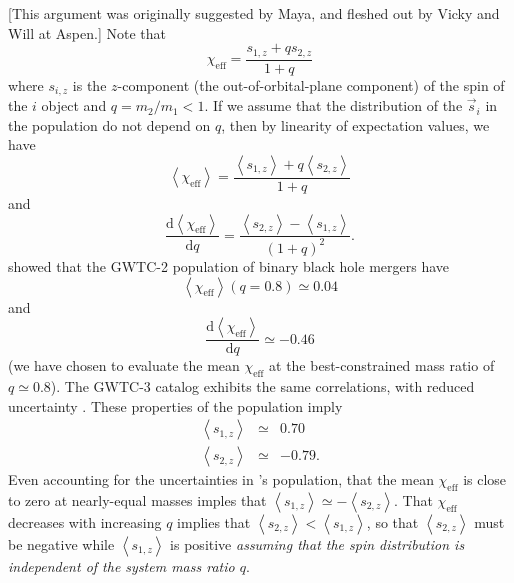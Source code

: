 \documentclass[modern]{aastex631}
\newcommand{\dd}{\mathrm{d}}
\newcommand{\diff}[2]{\frac{\dd #1}{\dd #2}}
\newcommand{\mean}[1]{\left\langle #1 \right\rangle}
\newcommand{\chieff}{\chi_{\mathrm{eff}}}
\begin{document}
[This argument was originally suggested by Maya, and fleshed out by Vicky and
Will at Aspen.]  Note that 
\begin{equation}
    \chieff = \frac{s_{1,z} + q s_{2,z}}{1+q}
\end{equation}
where $s_{i,z}$ is the $z$-component (the out-of-orbital-plane component) of the
spin of the $i$ object and $q = m_2 / m_1 < 1$.  If we assume that the
distribution of the $\vec{s}_i$ in the population do not depend on $q$, then by
linearity of expectation values, we have 
\begin{equation}
    \mean{\chieff} = \frac{\mean{s_{1,z}} + q \mean{s_{2,z}}}{1+q}
\end{equation}
and 
\begin{equation}
    \diff{\mean{\chieff}}{q} = \frac{\mean{s_{2,z}} - \mean{s_{1,z}}}{\left( 1 + q \right)^2}.
\end{equation}
\citet{Callister2021} showed that the GWTC-2 \citep{Abbott2021GWTC-2} population
of binary black hole mergers have 
\begin{equation}
    \mean{\chieff}\left( q = 0.8 \right) \simeq 0.04
\end{equation}
and
\begin{equation}
    \diff{\mean{\chieff}}{q} \simeq -0.46
\end{equation}
(we have chosen to evaluate the \citet{Callister2021} mean $\chieff$ at the
best-constrained mass ratio of $q \simeq 0.8$).  The GWTC-3 catalog exhibits the
same correlations, with reduced uncertainty \citep{Abbott2021GWTC-3}.  These
properties of the population imply 
\begin{eqnarray}
    \mean{s_{1,z}} & \simeq & 0.70 \\
    \mean{s_{2,z}} & \simeq & -0.79.
\end{eqnarray}
Even accounting for the uncertainties in \citet{Callister2021}'s population,
that the mean $\chieff$ is close to zero at nearly-equal masses imples that
$\mean{s_{1,z}} \simeq - \mean{s_{2,z}}$.  That $\chieff$ decreases with
increasing $q$ implies that $\mean{s_{2,z}} < \mean{s_{1,z}}$, so that
$\mean{s_{2,z}}$ must be negative while $\mean{s_{1,z}}$ is positive
\emph{assuming that the spin distribution is independent of the system mass
ratio $q$}.



\end{document}
